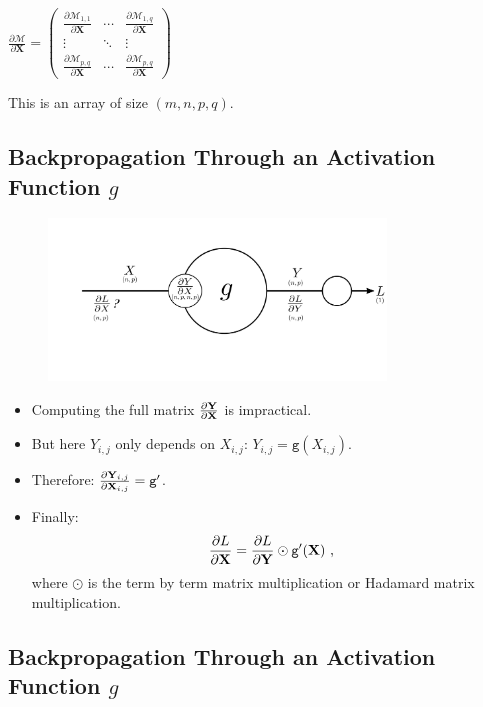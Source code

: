 \documentclass{book}
\newcommand{\X}{\mathbf{X}}
\newcommand{\Y}{\mathbf{Y}}
\newcommand{\act}{\texttt{g}}%
\newcommand{\loss}{L}
\begin{document}
\begin{myblock}{}
\centering
$\frac{\partial \mathcal{M}}{\partial \X} =
\begin{pmatrix}
\frac{\partial \mathcal{M}_{1,1}}{\partial \X} & \cdots & \frac{\partial \mathcal{M}_{1,q}}{\partial \X} \\
\vdots & \ddots & \vdots \\
\frac{\partial \mathcal{M}_{p,q}}{\partial \X} & \cdots & \frac{\partial \mathcal{M}_{p,q}}{\partial \X}
\end{pmatrix}
$

\end{myblock}

This is an array of size $(m, n, p, q)$.

\subsection{Backpropagation Through an Activation Function $g$}

\begin{figure}[h]
    \centering
    \includegraphics[width=0.8\textwidth]{bp_activation.png}
\end{figure}

\begin{itemize}
\item Computing the full matrix $\pdv{\Y}{\X}$ is impractical.
\item But here $Y_{i,j}$ only depends on $X_{i,j}$: $Y_{i,j} = \act(X_{i,j})$.
\item Therefore: $\pdv{\Y_{i,j}}{\X_{i,j}} = \act'$.
\item Finally:
\[
\pdv{\loss}{\X} = \pdv{\loss}{\Y} \odot \act'(\X) \text{ ,}
\]
where $\odot$ is the term by term matrix multiplication or Hadamard matrix multiplication.
\end{itemize}

\subsection{Backpropagation Through an Activation Function $g$}
\end{document}
